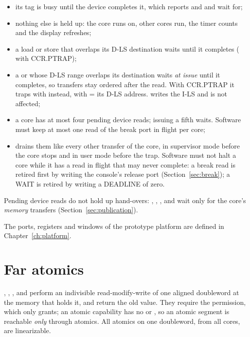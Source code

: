 \begin{itemize}
\item its tag is busy until the device completes it, which  reports and  and
   wait for;
\item nothing else is held up: the core runs on, other cores run, the timer counts and the display
  refreshes;
\item a load or store that overlaps its D-LS destination waits until it completes ( with
  CCR.PTRAP);
\item a  or  whose D-LS range overlaps its destination waits \emph{at issue} until
  it completes, so transfers stay ordered after the read. With CCR.PTRAP it traps with 
  instead, with  = its D-LS address.  writes the I-LS and is not affected;
\item a core has at most four pending device reads; issuing a fifth waits. Software must keep at most
  one read of the break port in flight per core;
\item {} drains them like every other transfer of the core, in supervisor mode before the core
  stops and in user mode before the  trap. Software must not halt a core while it has a
  read in flight that may never complete: a break read is retired first by writing the console's
  release port (Section~\ref{sec:break}); a WAIT is retired by writing a DEADLINE of zero.
\end{itemize}
Pending device reads do not hold up hand-overs: , , ,
 and  wait only for the core's \emph{memory} transfers
(Section~\ref{sec:publication}).

The ports, registers and windows of the prototype platform are defined in Chapter~\ref{ch:platform}.

\section{Far atomics}\label{sec:atomics}

, , ,  and  perform an
indivisible read-modify-write of one aligned doubleword at the memory that holds it, and return the old
value. They require the  permission, which only  grants; an atomic capability has
no  or , so an atomic segment is reachable \emph{only} through atomics. All atomics on
one doubleword, from all cores, are linearizable.

